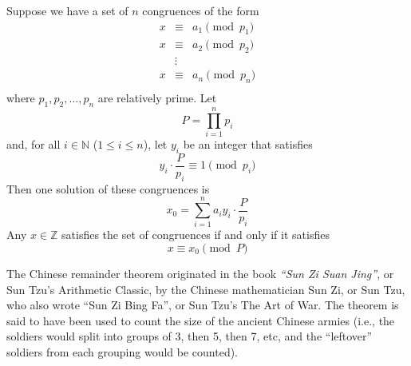 \documentclass[12pt]{article}
\begin{document}
Suppose we have a set of $n$ congruences of the form
\[ \begin{array}{ccc}
 x & \equiv & a_1 \pmod{p_1} \\
 x & \equiv & a_2 \pmod{p_2} \\
   & \vdots &  \\
x & \equiv & a_n \pmod{p_n} \\
\end{array} \]
where $p_1, p_2, \dots, p_n$ are relatively prime.  Let
$$P = \prod_{i=1}^n p_i$$
and, for all $i \in \mathbb{N}$ ($1 \leq i \leq n$), let $y_i$ be an integer that satisfies
$$y_i \cdot \frac{P}{p_i} \equiv 1 \pmod{p_i}$$
Then one solution of these congruences is
$$x_0 = \sum_{i=1}^n a_iy_i \cdot \frac{P}{p_i}$$
Any $x \in \mathbb{Z}$ satisfies the set of congruences if and only if it satisfies
\[ x \equiv x_0 \pmod{P} \]

The Chinese remainder theorem originated in the book \emph{``Sun Zi Suan Jing''}, or Sun Tzu's Arithmetic Classic, by the Chinese mathematician Sun Zi, or Sun Tzu, who also wrote ``Sun Zi Bing Fa'', or Sun Tzu's The Art of War.  The theorem is said to have been used to count the size of the ancient Chinese armies (i.e., the soldiers would split into groups of 3, then 5, then 7, etc, and the ``leftover'' soldiers from each grouping would be counted).
\end{document}
